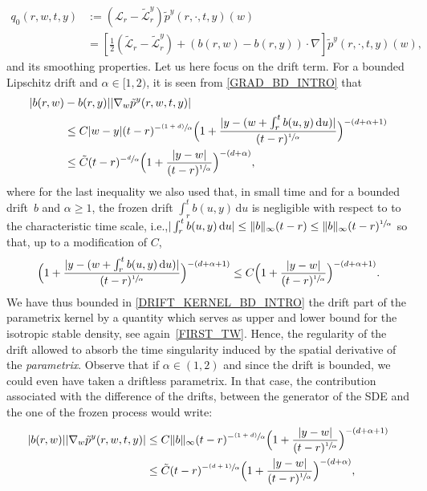 \documentclass[11pt]{article}
\newcommand{\ie}{i.e.,\xspace}
\numberwithin{equation}{section}\providecommand{\asymp}{\mathrel{\sim}}
\newcommand{\psfrac}[2]{\sfrac{(#1)}{#2}}
\theoremstyle{plain}
\theoremstyle{definition}
\newcommand\cL{{\mathcal L}}
\newcommand\1{{\mathbf{1}}}
\newcommand\sL{{\mathscr L}}
\newcommand{\dif}{\,\mathrm{d}}
\begin{document}
{\begin{align*}
q_0(r,w,t,y)&:=(\sL_{r}-\tilde \sL^{y}_r)\tilde p^y (r,\cdot,t,y)(w)\\
&=[\tfrac 12(\tilde \cL_r-\tilde \cL^{y}_{r}) +(b(r,w)-b(r, y))\cdot\nabla] \tilde p^y(r,\cdot,t,y)(w),%
\end{align*}
and its smoothing properties. Let us here focus on the drift term. For a bounded Lipschitz drift and $\alpha\in [1,2)$, it is seen from \eqref{GRAD_BD_INTRO} that
\begin{equation}\label{DRIFT_KERNEL_BD_INTRO}
\begin{aligned}
|b(r,w)&-b(r,y)||\nabla_w \tilde p^y(r,w,t,y)|\\
&\le  C |w-y|(t-r)^{-\psfrac{1+d}\alpha}\Bigl(1+\frac{|y-(w+\int_r^t b(u,y)\dif u)|}{(t-r)^{\sfrac 1\alpha}}\Bigr)^{-(d+\alpha+1)}\\
&\le  \tilde C (t-r)^{-\sfrac{d}\alpha}\Bigl(1+\frac{|y-w|}{(t-r)^{\sfrac 1\alpha}}\Bigr)^{-(d+\alpha)},
\end{aligned}
\end{equation}
where for the last inequality we also used that, in small time and for a bounded drift~$b $ and $\alpha\ge 1 $, the frozen drift $\int_r^t b(u,y)\dif u$ is negligible with respect to to the characteristic time scale, \ie $|\int_r^t b(u,y)\dif u|\le \|b\|_\infty(t-r)\le \|b\|_\infty(t-r)^{\sfrac 1\alpha} $ so that, up to a modification of $C$,
\[
\Bigl(1+\frac{|y-(w+\int_r^t b(u,y)\dif u)|}{(t-r)^{\sfrac 1\alpha}}\Bigr)^{-(d+\alpha+1)}\le C \Bigl(1+\frac{|y-w|}{(t-r)^{\sfrac 1\alpha}}\Bigr)^{-(d+\alpha+1)}.
\]
We have thus bounded in \eqref{DRIFT_KERNEL_BD_INTRO} the drift part of the parametrix kernel by a quantity which serves as upper and lower bound for the isotropic stable density, see again~\eqref{FIRST_TW}. Hence, the regularity of the drift allowed to absorb the time singularity induced by the spatial derivative of the \textit{parametrix}. Observe that if $\alpha\in (1,2) $ and since the drift is bounded, we could even have taken a driftless parametrix. In that case, the contribution associated with the difference of the drifts, between the generator of the SDE and the one of the frozen process would write:
\begin{equation}\label{DRIFT_KERNEL_BD_INTRO_SUB_CRIT}
\begin{aligned}
|b(r,w)||\nabla_w \tilde p^y(r,w,t,y)|
&\le  C \|b\|_\infty(t-r)^{-\psfrac{1+d}\alpha}\Bigl(1+\frac{|y-w|}{(t-r)^{\sfrac 1\alpha}}\Bigr)^{-(d+\alpha+1)}\\
&\le  \tilde C (t-r)^{-\psfrac{d+1}\alpha}\Bigl(1+\frac{|y-w|}{(t-r)^{\sfrac 1\alpha}}\Bigr)^{-(d+\alpha)},

\end{aligned}
\end{equation}}
\end{document}
